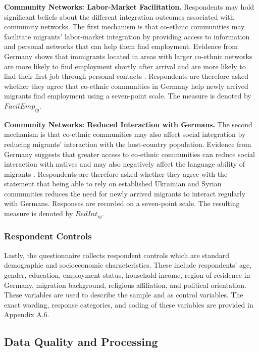 \noindent\textbf{Community Networks: Labor-Market Facilitation.} Respondents may hold significant beliefs about the 
different integration outcomes associated with community networks. The first mechanism is that co-ethnic 
communities may facilitate migrants' labor-market integration by providing access to information and personal 
networks that can help them find employment. Evidence from Germany shows that immigrants located in areas 
with larger co-ethnic networks are more likely to find employment shortly after arrival and are more likely to find 
their first job through personal contacts \citep{battisti2022dynamic}. Respondents are therefore asked whether they agree 
that co-ethnic communities in Germany help newly arrived migrants find employment using a seven-point scale. 
The measure is denoted by \(FacilEmp_{ig}\). \bigskip

\noindent\textbf{Community Networks: Reduced Interaction with Germans.} The second mechanism is that co-ethnic 
communities may also affect social integration by reducing migrants' interaction with the host-country population. 
Evidence from Germany suggests that greater access to co-ethnic communities can reduce social interaction with natives 
and may also negatively affect the language ability of migrants \citep{danzer2013ethnic, danzer2016ethnic}. 
Respondents are therefore asked whether they agree with the statement that being able to rely on established 
Ukrainian and Syrian communities reduces the need for newly arrived migrants to interact regularly with Germans. 
Responses are recorded on a seven-point scale. The resulting measure is denoted by \(RedInt_{ig}\).

\subsubsection{Respondent Controls}

Lastly, the questionnaire collects respondent controls which are standard demographic and socioeconomic characteristics. These include 
respondents' age, gender, education, employment status, household income, region of residence in Germany, migration 
background, religious affiliation, and political orientation. These variables are used to describe 
the sample and as control variables. The exact wording, response categories, and coding of these variables are provided 
in Appendix A.6.

\subsection{Data Quality and Processing}

